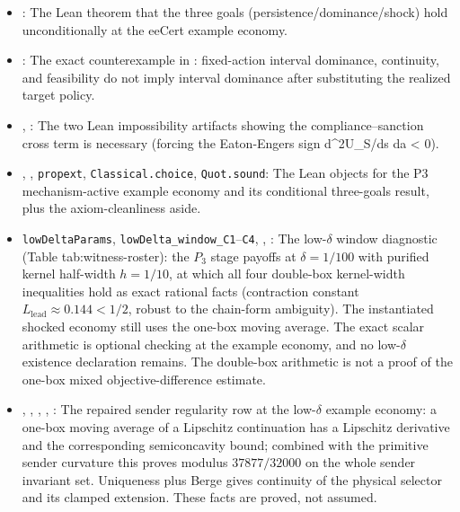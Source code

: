\begin{itemize}[leftmargin=1.4em,itemsep=1pt]
\item {}: The Lean theorem that the three goals (persistence/dominance/shock) hold unconditionally at the eeCert example economy.
\item {}: The exact counterexample in : fixed-action interval dominance, continuity, and feasibility do not imply interval dominance after substituting the realized target policy.
\item {}, : The two Lean impossibility artifacts showing the compliance--sanction cross term is necessary (forcing the Eaton-Engers sign d\textasciicircum{}2U\_S/ds da \textless{} 0).
\item {}, , \texttt{propext}, \texttt{Classical.choice}, \texttt{Quot.sound}: The Lean objects for the P3 mechanism-active example economy and its conditional three-goals result, plus the axiom-cleanliness aside.
\item \texttt{lowDeltaParams}, \texttt{lowDelta\_window\_C1}--\texttt{C4}, , : The low-$\delta$ window diagnostic (Table tab:witness-roster): the $P_3$ stage payoffs at $\delta=1/100$ with purified kernel half-width $h=1/10$, at which all four double-box kernel-width inequalities hold as exact rational facts (contraction constant $L_{\mathrm{lead}}\approx0.144<1/2$, robust to the chain-form ambiguity). The instantiated shocked economy still uses the one-box moving average. The exact scalar arithmetic is optional checking at the example economy, and no low-$\delta$ existence declaration remains. The double-box arithmetic is not a proof of the one-box mixed objective-difference estimate.
\item {}, , , , : The repaired sender regularity row at the low-$\delta$ example economy: a one-box moving average of a Lipschitz continuation has a Lipschitz derivative and the corresponding semiconcavity bound; combined with the primitive sender curvature this proves modulus \(37877/32000\) on the whole sender invariant set. Uniqueness plus Berge gives continuity of the physical selector and its clamped extension. These facts are proved, not assumed.

\end{itemize}
